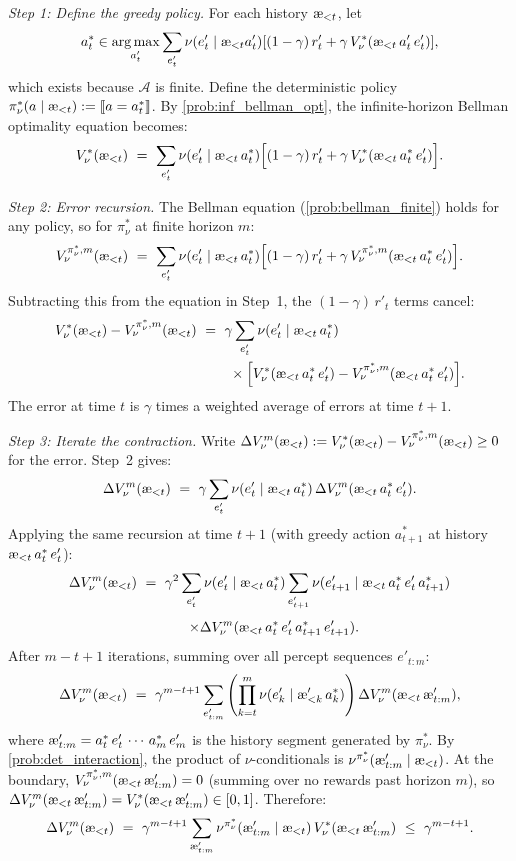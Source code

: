 \documentclass[fontsize=11pt, parskip=half]{scrartcl}
\newcommand{\cA}{\mathcal{A}}
\DeclareMathOperator*{\argmax}{arg\,max}
\newcommand{\aes}{\textnormal{\ae}}
\begin{document}
\begin{solution}
\emph{Step 1: Define the greedy policy.}
For each history $\aes_{<t}$, let
$$
a^*_t \in \argmax_{a'_t} \sum_{e'_t} \nu(e'_t \mid \aes_{<t} a'_t) [(1-\gamma)\, r'_t + \gamma\, V_\nu^*(\aes_{<t}\, a'_t\, e'_t)],
$$
which exists because $\cA$ is finite.
Define the deterministic policy $\pi_\nu^*(a \mid \aes_{<t}) := \llbracket a = a^*_t \rrbracket$.
By \cref{prob:inf_bellman_opt}, the infinite-horizon Bellman optimality equation becomes:
\[
    V_\nu^*(\aes_{<t}) ~=~ \sum_{e'_t} \nu(e'_t \mid \aes_{<t}\, a^*_t) \Big[(1-\gamma)\, r'_t + \gamma\, V_\nu^*(\aes_{<t}\, a^*_t\, e'_t)\Big].
\]

\emph{Step 2: Error recursion.}
The Bellman equation (\cref{prob:bellman_finite}) holds for any policy, so for $\pi_\nu^*$ at finite horizon $m$:
\[
    V_\nu^{\pi_\nu^*,m}(\aes_{<t}) ~=~ \sum_{e'_t} \nu(e'_t \mid \aes_{<t}\, a^*_t) \Big[(1-\gamma)\, r'_t + \gamma\, V_\nu^{\pi_\nu^*,m}(\aes_{<t}\, a^*_t\, e'_t)\Big].
\]
Subtracting this from the equation in Step~1, the $(1-\gamma)\, r'_t$ terms cancel:
\begin{align*}
    V_\nu^*(\aes_{<t}) - V_\nu^{\pi_\nu^*,m}(\aes_{<t})
    ~&=~ \gamma \sum_{e'_t} \nu(e'_t \mid \aes_{<t}\, a^*_t) \\
    &\qquad \times \Big[V_\nu^*(\aes_{<t}\, a^*_t\, e'_t) - V_\nu^{\pi_\nu^*,m}(\aes_{<t}\, a^*_t\, e'_t)\Big].
\end{align*}
The error at time $t$ is $\gamma$ times a weighted average of errors at time $t+1$.

\emph{Step 3: Iterate the contraction.}
Write $\Delta V_\nu^m(\aes_{<t}) := V_\nu^*(\aes_{<t}) - V_\nu^{\pi_\nu^*,m}(\aes_{<t}) \geq 0$ for the error. Step~2 gives:
\[
    \Delta V_\nu^m(\aes_{<t}) ~=~ \gamma \sum_{e'_t} \nu(e'_t \mid \aes_{<t}\, a^*_t)\, \Delta V_\nu^m(\aes_{<t}\, a^*_t\, e'_t).
\]
Applying the same recursion at time $t+1$ (with greedy action $a^*_{t+1}$ at history $\aes_{<t}\, a^*_t\, e'_t$):
\[
    \Delta V_\nu^m(\aes_{<t}) ~=~ \gamma^2 \sum_{e'_t} \nu(e'_t \mid \aes_{<t}\, a^*_t)
    \sum_{e'_{t+1}} \nu(e'_{t+1} \mid \aes_{<t}\, a^*_t\, e'_t\, a^*_{t+1})
\]
\[
    \qquad
    \times \Delta V_\nu^m(\aes_{<t}\, a^*_t\, e'_t\, a^*_{t+1}\, e'_{t+1}).
\]
After $m - t + 1$ iterations, summing over all percept sequences $e'_{t:m}$:
\[
    \Delta V_\nu^m(\aes_{<t}) ~=~ \gamma^{m-t+1} \sum_{e'_{t:m}} \left(\prod_{k=t}^m \nu(e'_k \mid \aes'_{<k}\, a^*_k)\right) \Delta V_\nu^m(\aes_{<t}\, \aes'_{t:m}),
\]
where $\aes'_{t:m} = a^*_t\, e'_t\, \cdots\, a^*_m\, e'_m$ is the history segment generated by $\pi_\nu^*$.
By \cref{prob:det_interaction}, the product of $\nu$-conditionals is $\nu^{\pi_\nu^*}(\aes'_{t:m} \mid \aes_{<t})$.
At the boundary, $V_\nu^{\pi_\nu^*,m}(\aes_{<t}\, \aes'_{t:m}) = 0$ (summing over no rewards past horizon $m$), so $\Delta V_\nu^m(\aes_{<t}\, \aes'_{t:m}) = V_\nu^*(\aes_{<t}\, \aes'_{t:m}) \in [0,1]$.
Therefore:
\[
    \Delta V_\nu^m(\aes_{<t})
    ~=~ \gamma^{m-t+1} \sum_{\aes'_{t:m}} \nu^{\pi_\nu^*}(\aes'_{t:m} \mid \aes_{<t})\, V_\nu^*(\aes_{<t}\, \aes'_{t:m})
    ~\leq~ \gamma^{m-t+1}.
\]


\end{solution}
\end{document}
